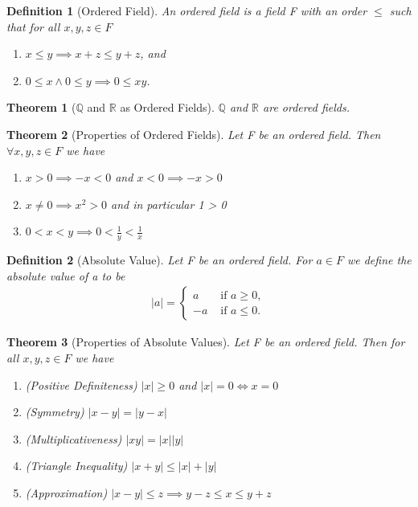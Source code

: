 \documentclass[11pt, oneside]{book}
\theoremstyle{break}
\newtheorem{thm}{Theorem}[section]
\newtheorem{defn}{Definition}[section]
\newcommand{\bb}[1]{\mathbb{#1}}			%
\begin{document}
\begin{defn}[Ordered Field]
	An ordered field is a field F with an order $\leq$ such that for all $x ,y ,z \in F$
	\begin{enumerate}
		\item $x \leq y \implies x + z \leq y + z$, and
		\item $0 \leq x \land 0 \leq y \implies 0 \leq xy$.
	\end{enumerate}
\end{defn}

\begin{thm}[$\bb{Q}$ and $\bb{R}$ as Ordered Fields]
	$\bb{Q}$ and $\bb{R}$ are ordered fields.
\end{thm}

\begin{thm}[Properties of Ordered Fields]
	Let F be an ordered field. Then $\forall x, y, z \in F$ we have
	\begin{enumerate}
		\item $x > 0 \implies -x < 0$ and $x < 0 \implies -x > 0$
		\item $x \neq 0 \implies x^2 > 0$ and in particular 1 > 0
		\item $0 < x < y \implies 0 < \frac{1}{y} < \frac{1}{x}$
	\end{enumerate}
\end{thm}

\begin{defn}[Absolute Value]
	Let F be an ordered field. For $a \in F$ we define the absolute value of a to be
	\begin{gather*}
		|a| =
		\begin{cases}
			 a & \text{ if } a \geq 0, \\
			-a & \text{ if } a \leq 0.
		\end{cases}
	\end{gather*}
\end{defn}

\begin{thm}[Properties of Absolute Values]
	Let F be an ordered field. Then for all $x, y, z \in F$ we have
	\begin{enumerate}
		\item (Positive Definiteness) $|x| \geq 0$ and $|x| = 0 \iff x = 0$
		\item (Symmetry) $|x - y| = |y - x|$
		\item (Multiplicativeness) $|xy| = |x||y|$
		\item (Triangle Inequality) $|x + y| \leq |x| + |y|$
		\item (Approximation) $|x - y| \leq z \implies y - z \leq x \leq y + z$
	\end{enumerate}
\end{thm}
\end{document}
